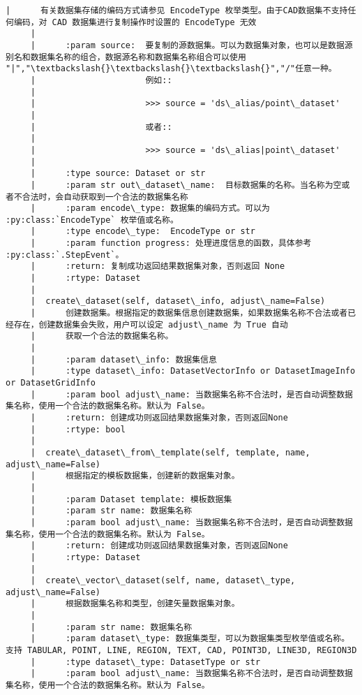 \documentclass[11pt]{article}
\begin{document}
\begin{Verbatim}[commandchars=\\\{\}]
     |      有关数据集存储的编码方式请参见 EncodeType 枚举类型。由于CAD数据集不支持任何编码，对 CAD 数据集进行复制操作时设置的 EncodeType 无效
     |      
     |      :param source:  要复制的源数据集。可以为数据集对象，也可以是数据源别名和数据集名称的组合，数据源名称和数据集名称组合可以使用 "|","\textbackslash{}\textbackslash{}\textbackslash{}","/"任意一种。
     |                      例如::
     |      
     |                      >>> source = 'ds\_alias/point\_dataset'
     |      
     |                      或者::
     |      
     |                      >>> source = 'ds\_alias|point\_dataset'
     |      
     |      :type source: Dataset or str
     |      :param str out\_dataset\_name:  目标数据集的名称。当名称为空或者不合法时，会自动获取到一个合法的数据集名称
     |      :param encode\_type: 数据集的编码方式。可以为 :py:class:`EncodeType` 枚举值或名称。
     |      :type encode\_type:  EncodeType or str
     |      :param function progress: 处理进度信息的函数，具体参考 :py:class:`.StepEvent`。
     |      :return: 复制成功返回结果数据集对象，否则返回 None
     |      :rtype: Dataset
     |  
     |  create\_dataset(self, dataset\_info, adjust\_name=False)
     |      创建数据集。根据指定的数据集信息创建数据集，如果数据集名称不合法或者已经存在，创建数据集会失败，用户可以设定 adjust\_name 为 True 自动
     |      获取一个合法的数据集名称。
     |      
     |      :param dataset\_info: 数据集信息
     |      :type dataset\_info: DatasetVectorInfo or DatasetImageInfo or DatasetGridInfo
     |      :param bool adjust\_name: 当数据集名称不合法时，是否自动调整数据集名称，使用一个合法的数据集名称。默认为 False。
     |      :return: 创建成功则返回结果数据集对象，否则返回None
     |      :rtype: bool
     |  
     |  create\_dataset\_from\_template(self, template, name, adjust\_name=False)
     |      根据指定的模板数据集，创建新的数据集对象。
     |      
     |      :param Dataset template: 模板数据集
     |      :param str name: 数据集名称
     |      :param bool adjust\_name: 当数据集名称不合法时，是否自动调整数据集名称，使用一个合法的数据集名称。默认为 False。
     |      :return: 创建成功则返回结果数据集对象，否则返回None
     |      :rtype: Dataset
     |  
     |  create\_vector\_dataset(self, name, dataset\_type, adjust\_name=False)
     |      根据数据集名称和类型，创建矢量数据集对象。
     |      
     |      :param str name: 数据集名称
     |      :param dataset\_type: 数据集类型，可以为数据集类型枚举值或名称。支持 TABULAR, POINT, LINE, REGION, TEXT, CAD, POINT3D, LINE3D, REGION3D
     |      :type dataset\_type: DatasetType or str
     |      :param bool adjust\_name: 当数据集名称不合法时，是否自动调整数据集名称，使用一个合法的数据集名称。默认为 False。

\end{Verbatim}
\end{document}
